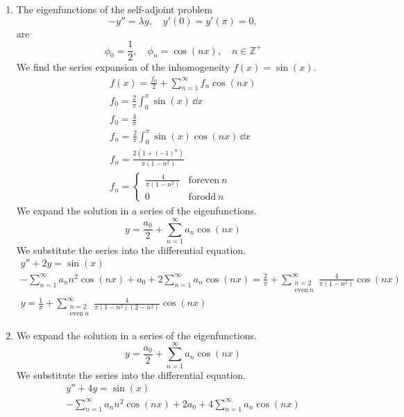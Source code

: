 {\begin{Solution}
  \begin{enumerate} 
  \item 
    The eigenfunctions of the self-adjoint problem
    \[
    -y'' = \lambda y, \quad y'(0) = y'(\pi) = 0,
    \]
    are 
    \[
    \phi_0 = \frac{1}{2}, \quad \phi_n = \cos(n x), \quad n \in \mathbb{Z}^+
    \]
    We find the series expansion of the inhomogeneity $f(x) = \sin(x)$.
    \begin{gather*}
      f(x) = \frac{f_0}{2} + \sum_{n = 1}^\infty f_n \cos(n x)
      \\
      f_0 = \frac{2}{\pi} \int_0^\pi \sin(x) \,\dd x 
      \\
      f_0 = \frac{4}{\pi}
      \\
      f_n = \frac{2}{\pi} \int_0^\pi \sin(x) \cos(n x)\,\dd x 
      \\
      f_n = \frac{ 2 (1 + (-1)^n) }{ \pi (1 - n^2) }
      \\
      f_n = \begin{cases}
        \frac{ 4 }{ \pi (1 - n^2) } &\mathrm{for even}\ n \\
        0 &\mathrm{for odd}\ n
      \end{cases}
    \end{gather*}
    We expand the solution in a series of the eigenfunctions.
    \[
    y = \frac{a_0}{2} + \sum_{n = 1}^\infty a_n \cos(n x)
    \]
    We substitute the series into the differential equation.
    \begin{gather*}
      y'' + 2 y = \sin(x)
      \\
      - \sum_{n = 1}^\infty a_n n^2 \cos(n x) + a_0 + 2 \sum_{n = 1}^\infty a_n \cos(n x)
      = \frac{2}{\pi} 
      + \sum_{\substack{n = 2 \\ \mathrm{even}\ n}}^\infty \frac{ 4 }{ \pi (1 - n^2) } \cos(n x)
      \\
      \boxed{
        y = \frac{1}{\pi}
        + \sum_{\substack{n = 2 \\ \mathrm{even}\ n}}^\infty \frac{ 4 }{ \pi (1 - n^2)(2 - n^2) } \cos(n x)
        }
    \end{gather*}
  \item 
    We expand the solution in a series of the eigenfunctions.
    \[
    y = \frac{a_0}{2} + \sum_{n = 1}^\infty a_n \cos(n x)
    \]
    We substitute the series into the differential equation.
    \begin{gather*}
      y'' + 4 y = \sin(x)
      \\
      - \sum_{n = 1}^\infty a_n n^2 \cos(n x) + 2 a_0 + 4 \sum_{n = 1}^\infty a_n \cos(n x)

\end{gather*}
\end{enumerate}
\end{Solution}}

